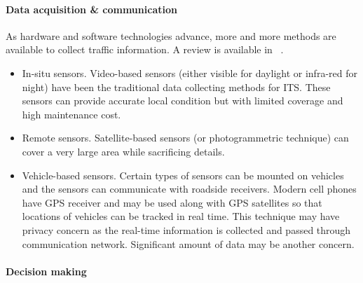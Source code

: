 \documentclass[letterpaper, twocolumn, 10pt, conference]{IEEEtran}
\begin{document}
\paragraph{Data acquisition \& communication}


As hardware and software technologies advance, more and more methods are available to collect traffic information. A review is available in ~\cite{prabha2016}.



\begin{itemize}
\item In-situ sensors. Video-based sensors (either visible for daylight or infra-red for night) have been the traditional data collecting methods for ITS. These sensors can provide accurate local condition but with limited coverage and high maintenance cost.

\item Remote sensors. Satellite-based sensors (or photogrammetric technique) can cover a very large area while sacrificing details.  

\item Vehicle-based sensors. Certain types of sensors can be mounted on vehicles and the sensors can communicate with roadside receivers. Modern cell phones have GPS receiver and may be used along with GPS satellites so that locations of vehicles can be tracked in real time. This technique may have privacy concern as the real-time information is collected and passed through communication network. Significant amount of data may be another concern.

\end{itemize}

\paragraph{Decision making}


\end{document}
